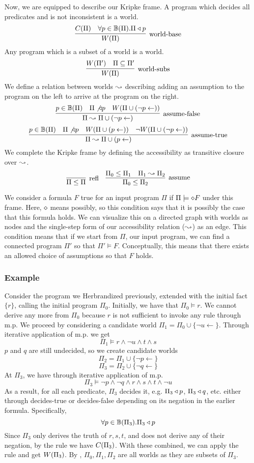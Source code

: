 Now, we are equipped to describe our Kripke frame.
A program which decides all predicates and is not inconsistent is a world.
\[
	\infer[\textrm{world-base}]{\world{\Pi}}{\cons{\Pi} & \forall p \in \hb(\Pi). \Pi \decides p}
\]
Any program which is a subset of a world is a world.
\[
	\infer[\textrm{world-subs}]{\world{\Pi}}{\world{\Pi'} & \Pi \subseteq \Pi'}
\]
We define a relation between worlds $\leadsto$ describing adding an assumption to the program on the left to arrive at the program on the right.
\[
	\infer[\textrm{assume-false}]{\Pi \stepass \Pi \cup (\neg p \leftarrow)}{p \in \hb(\Pi) & \Pi \not \decides p & \world{\Pi \cup (\neg p \leftarrow)}}
\]
\[
	\infer[\textrm{assume-true}]{\Pi \stepass \Pi \cup (p \leftarrow)}{p \in \hb(\Pi) & \Pi \not \decides p & \world{\Pi \cup (p \leftarrow)} & \neg \world{\Pi \cup (\neg p \leftarrow)}}
\]
We complete the Kripke frame by defining the accessibility as transitive closure over $\leadsto$.
\[
	\infer[\textrm{refl}]{\Pi \leq \Pi}{}
	\quad
	\infer[\textrm{assume}]{\Pi_0 \leq \Pi_2}{\Pi_0 \leq \Pi_1 & \Pi_1 \stepass \Pi_2}
\]

We consider a formula $F$ true for an input program $\Pi$ if $\Pi \models \diamond  F$ under this frame.
Here, $\diamond$ means possibly, so this condition says that it is possibly the case that this formula holds.
We can visualize this on a directed graph with worlds as nodes and the single-step form of our accessibility relation ($\leadsto$) as an edge.
This condition means that if we start from $\Pi$, our input program, we can find a connected program $\Pi'$ so that $\Pi' \models F$.
Conceptually, this means that there exists an allowed choice of assumptions so that $F$ holds.

\subsubsection{Example}
Consider the program we Herbrandized previously, extended with the initial fact $\{r\}$, calling the initial program $\Pi_0$.
Initially, we have that $\Pi_0 \models r$.
We cannot derive any more from $\Pi_0$ because $r$ is not sufficient to invoke any rule through m.p.
We proceed by considering a candidate world $\Pi_1 = \Pi_0 \cup \{\neg u \leftarrow\}$.
Through iterative application of m.p. we get
\[
\Pi_1 \models r \wedge \neg u \wedge t \wedge s
\]
$p$ and $q$ are still undecided, so we create candidate worlds
\[\Pi_2 = \Pi_1 \cup \{\neg p \leftarrow\}\]
\[\Pi_3 = \Pi_2 \cup \{\neg q \leftarrow\}\]
At $\Pi_3$, we have through iterative application of m.p.
\[
\Pi_3 \models \neg p \wedge \neg q \wedge r \wedge s \wedge t \wedge \neg u
\]
As a result, for all each predicate, $\Pi_3$ decides it, e.g. $\Pi_3 \triangleleft p$, $\Pi_3 \triangleleft q$, etc. either through decides-true or decides-false depending on its negation in the earlier formula.
Specifically,
\[
\forall p \in \mathbb{B}(\Pi_3). \Pi_3 \triangleleft p
\]
Since $\Pi_3$ only derives the truth of $r, s, t$, and does not derive any of their negation, by the  rule we have $C(\Pi_3)$.
With these combined, we can apply the  rule and get $W({\Pi_3})$.
By , $\Pi_0, \Pi_1, \Pi_2$ are all worlds as they are subsets of $\Pi_3$.

